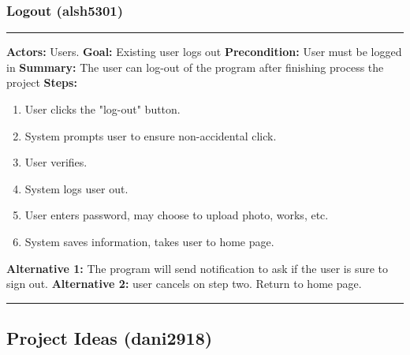 \documentclass[11pt]{report}
\begin{document}
\subsubsection{Logout (alsh5301)}
\vspace{2pt}
\hrule
\vspace{8pt}
 \textbf{Actors:} Users. \newline
\textbf{Goal:} Existing user logs out \newline
\textbf{Precondition:} User must be logged in \newline
 \textbf{Summary:}  The user can log-out of the program after finishing process the project  \newline
 \textbf{Steps:} \begin{enumerate}
 \item User clicks the "log-out" button.
 \item System prompts user to ensure non-accidental click.
 \item User verifies.
 \item System logs user out.
 \item User enters password, may choose to upload photo, works, etc.
 \item System saves information, takes user to home page.
 \end{enumerate}
  \textbf{Alternative 1:} The program will send notification to ask if the user is sure to sign out. \newline
  \textbf{Alternative 2:} user cancels on step two. Return to home page. \newline
\vspace{8pt}
\hrule
\newpage

\subsection{Project Ideas (dani2918)}
\end{document}
